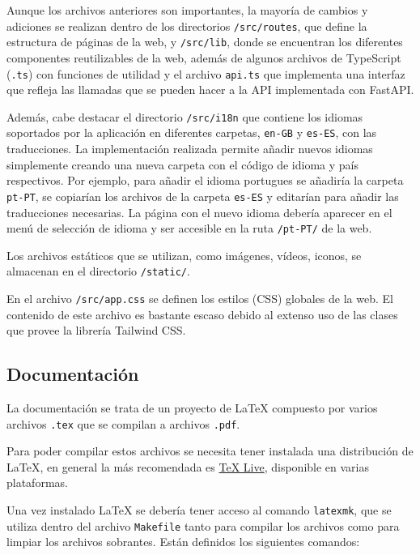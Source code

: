 Aunque los archivos anteriores son importantes, la mayoría de cambios y
adiciones se realizan dentro de los directorios \texttt{/src/routes}, que define
la estructura de páginas de la web, y \texttt{/src/lib}, donde se encuentran los
diferentes componentes reutilizables de la web, además de algunos archivos de
TypeScript (\texttt{.ts}) con funciones de utilidad y el archivo \texttt{api.ts}
que implementa una interfaz que refleja las llamadas que se pueden hacer a la
API implementada con FastAPI.

Además, cabe destacar el directorio \texttt{/src/i18n} que contiene los idiomas
soportados por la aplicación en diferentes carpetas, \texttt{en-GB} y
\texttt{es-ES}, con las traducciones. La implementación realizada permite añadir
nuevos idiomas simplemente creando una nueva carpeta con el código de idioma y
país respectivos. Por ejemplo, para añadir el idioma portugues se añadiría la
carpeta \texttt{pt-PT}, se copiarían los archivos de la carpeta \texttt{es-ES} y
editarían para añadir las traducciones necesarias. La página con el nuevo idioma
debería aparecer en el menú de selección de idioma y ser accesible en la ruta
\texttt{/pt-PT/} de la web.

Los archivos estáticos que se utilizan, como imágenes, vídeos, iconos, se
almacenan en el directorio \texttt{/static/}.

En el archivo \texttt{/src/app.css} se definen los estilos (CSS) globales de la
web. El contenido de este archivo es bastante escaso debido al extenso uso de
las clases que provee la librería Tailwind CSS.

\subsection{Documentación}

La documentación se trata de un proyecto de \LaTeX{} compuesto por varios
archivos \texttt{.tex} que se compilan a archivos \texttt{.pdf}.

Para poder compilar estos archivos se necesita tener instalada una distribución
de \LaTeX{}, en general la más recomendada es
\href{https://www.tug.org/texlive/}{TeX Live}, disponible en varias plataformas.

Una vez instalado \LaTeX{} se debería tener acceso al comando \texttt{latexmk},
que se utiliza dentro del archivo \texttt{Makefile} tanto para compilar los
archivos como para limpiar los archivos sobrantes. Están definidos los
siguientes comandos:

